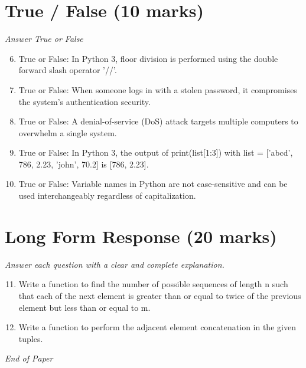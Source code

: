 \documentclass[12pt]{article}
\begin{document}
\section*{True / False (10 marks)}
\textit{Answer True or False}
\begin{enumerate}[label=\arabic*.]
\setcounter{enumi}{5}
\item True or False: In Python 3, floor division is performed using the double forward slash operator '//'.
\item True or False: When someone logs in with a stolen password, it compromises the system's authentication security.
\item True or False: A denial-of-service (DoS) attack targets multiple computers to overwhelm a single system.
\item True or False: In Python 3, the output of print(list[1:3]) with list = ['abcd', 786, 2.23, 'john', 70.2] is [786, 2.23].
\item True or False: Variable names in Python are not case-sensitive and can be used interchangeably regardless of capitalization.
\end{enumerate}

\section*{Long Form Response (20 marks)}
\textit{Answer each question with a clear and complete explanation.}
\begin{enumerate}[label=\arabic*.]
\setcounter{enumi}{10}
\item Write a function to find the number of possible sequences of length n such that each of the next element is greater than or equal to twice of the previous element but less than or equal to m.
\item Write a function to perform the adjacent element concatenation in the given tuples.
\end{enumerate}

\vfill
\noindent\textit{End of Paper}
\end{document}
